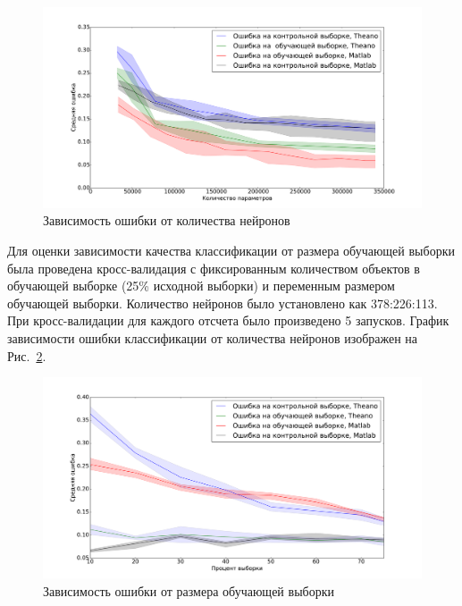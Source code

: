 \documentclass[12pt,twoside]{article}
\begin{document}
\begin{figure}[tb!]
  \centering
      \includegraphics[width=1.0\textwidth]{neurons.pdf}
  \caption{Зависимость ошибки от количества нейронов}
  \label{fig:neurons}
\end{figure}


Для оценки зависимости качества классификации от размера обучающей выборки была проведена кросс-валидация с фиксированным количеством объектов в обучающей выборке (25\% исходной выборки) и переменным размером обучающей выборки. Количество нейронов было установлено как 378:226:113. При кросс-валидации для каждого отсчета было произведено 5 запусков. График зависимости ошибки классификации от количества нейронов изображен на Рис.~\ref{fig:samples}.



\begin{figure}[tb!]
  \centering
      \includegraphics[width=1.0\textwidth]{samples.pdf}
  \caption{Зависимость ошибки от размера обучающей выборки}
  \label{fig:samples}
\end{figure}
\end{document}
